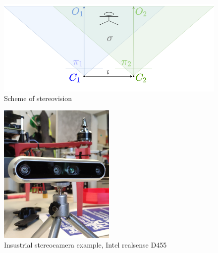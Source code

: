 \begin{figure}[h]
    \centering
    \includegraphics[width=1\textwidth]{graphics/stereopair.png}
    \caption{Scheme of stereovision}
    \label{fig:sch_stereo}
\end{figure}
\begin{figure}[h]
    \centering
    \includegraphics[width=0.5\textwidth]{graphics/stereo_example.jpg}
    \caption{Insustrial stereocamera example, Intel realsense D455}
    \label{fig:stereo_ex}
\end{figure}

